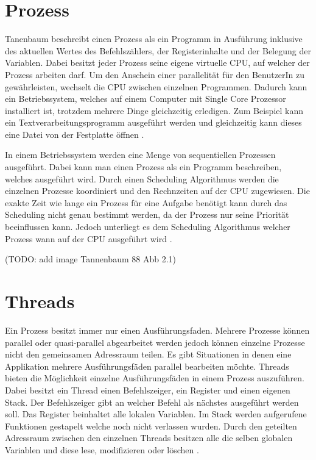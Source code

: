 \section{Prozess}

Tanenbaum beschreibt einen Prozess als ein Programm in Ausführung inklusive des aktuellen Wertes des Befehlszählers, der Registerinhalte und der Belegung der Variablen. Dabei besitzt jeder Prozess seine eigene virtuelle CPU, auf welcher der Prozess arbeiten darf. Um den Anschein einer parallelität für den BenutzerIn zu gewährleisten, wechselt die CPU zwischen einzelnen Programmen. Dadurch kann ein Betriebssystem, welches auf einem Computer mit Single Core Prozessor installiert ist, trotzdem mehrere Dinge gleichzeitig erledigen. Zum Beispiel kann ein Textverarbeitungsprogramm ausgeführt werden und gleichzeitig kann dieses eine Datei von der Festplatte öffnen \cite[p. 87]{tan09}.

In einem Betriebssystem werden eine Menge von sequentiellen Prozessen ausgeführt. Dabei kann man einen Prozess als ein Programm beschreiben, welches ausgeführt wird. Durch einen Scheduling Algorithmus werden die einzelnen Prozesse koordiniert und den Rechnzeiten auf der CPU zugewiesen. Die exakte Zeit wie lange ein Prozess für eine Aufgabe benötigt kann durch das Scheduling nicht genau bestimmt werden, da der Prozess nur seine Priorität beeinflussen kann. Jedoch unterliegt es dem Scheduling Algorithmus welcher Prozess wann auf der CPU ausgeführt wird \cite[p. 88]{tan09}. 

(TODO: add image Tannenbaum 88 Abb 2.1)

\section{Threads}
\label{section: Threads}
Ein Prozess besitzt immer nur einen Ausführungsfaden. Mehrere Prozesse können parallel oder quasi-parallel abgearbeitet werden jedoch können einzelne Prozesse nicht den gemeinsamen Adressraum teilen. Es gibt Situationen in denen eine Applikation mehrere Ausführungsfäden parallel bearbeiten möchte. Threads bieten die Möglichkeit einzelne Ausführungsfäden in einem Prozess auszuführen. Dabei besitzt ein Thread einen Befehlszeiger, ein Register und einen eigenen Stack. Der Befehlszeiger gibt an welcher Befehl als nächstes ausgeführt werden soll. Das Register beinhaltet alle lokalen Variablen. Im Stack werden aufgerufene Funktionen gestapelt welche noch nicht verlassen wurden. Durch den geteilten Adressraum zwischen den einzelnen Threads besitzen alle die selben globalen Variablen und diese lese, modifizieren oder löschen \cite[p. 97]{tan09}. 

